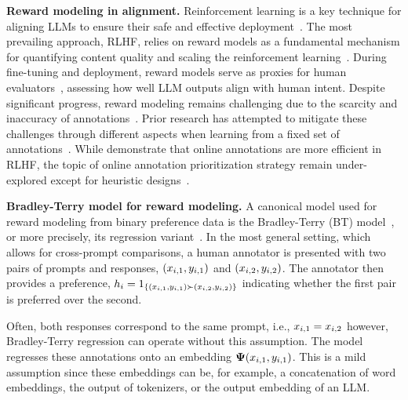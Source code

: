 
\textbf{Reward modeling in alignment.} Reinforcement learning is a key technique for aligning LLMs to ensure their safe and effective deployment~\citep{christiano2017deep, ouyang2022training, stiennon2020learning}. The most prevailing approach, RLHF, relies on reward models as a fundamental mechanism for quantifying content quality and scaling the reinforcement learning~\citep{lambert2024rewardbench, wang2024secrets}. During fine-tuning and deployment, reward models serve as proxies for human evaluators~\citep{dubey2024llama, dong2024rlhf, wang2024arithmetic}, assessing how well LLM outputs align with human intent.
Despite significant progress, reward modeling remains challenging due to the scarcity and inaccuracy of annotations~\citep{lambert2024rewardbench,wang2024secrets,gao2023scaling}. Prior research has attempted to mitigate these challenges through different aspects when learning from a fixed set of annotations~\citep{wang2024arithmetic,winata2024metametrics,liu2024skywork,lou2024uncertainty,coste2023reward,zhang2024overcoming}. While \citet{xiong2023gibbs,dong2024rlhf} demonstrate that online annotations are more efficient in RLHF, the topic of online annotation prioritization strategy remain under-explored except for heuristic designs~\citep{muldrew2024active}.


\textbf{Bradley-Terry model for reward modeling.}
A canonical model used for reward modeling from binary preference data is the Bradley-Terry (BT) model~\citep{bradley1952rank}, or more precisely, its regression variant~\citep{sun2024rethinking}. In the most general setting, which allows for cross-prompt comparisons, a human annotator is presented with two pairs of prompts and responses, $(x_{i,1}, y_{i,1})$ and $(x_{i,2}, y_{i,2})$. The annotator then provides a preference, $h_{i}=1_{\{(x_{i,1}, y_{i,1})\succ (x_{i,2}, y_{i,2})\}}$ indicating whether the first pair is preferred over the second.

Often, both responses correspond to the same prompt, i.e., $x_{i,1}=x_{i,2}$ however, Bradley-Terry regression can operate without this assumption. The model regresses these annotations onto an embedding $\bm{\Psi}(x_{i,1}, y_{i,1})$. This is a mild assumption since these embeddings can be, for example, a concatenation of word embeddings, the output of tokenizers, or the output embedding of an LLM. 

